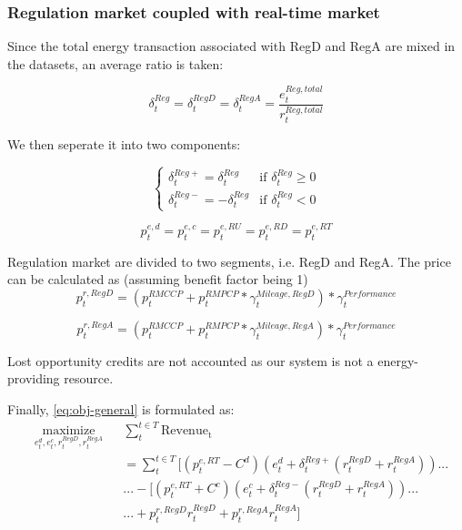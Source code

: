 \subsubsection{Regulation market coupled with real-time market}

Since the total energy transaction associated with RegD and RegA are mixed in the datasets, an average ratio is taken:

\begin{equation*}
\delta^{Reg}_t = \delta^{RegD}_t =\delta^{RegA}_t   = \frac{e_t^{Reg, total}}{r_t^{Reg, total}}
\end{equation*}

We then seperate it into two components:

\begin{equation*}
\begin{cases} 
\delta^{Reg+}_t = \delta^{Reg}_t &\mbox{if } \delta^{Reg}_t \geq 0 \\ 
\delta^{Reg-}_t = -\delta^{Reg}_t & \mbox{if } \delta^{Reg}_t < 0 
\end{cases} 
\end{equation*}

\begin{equation*}
p_t^{e, d} = p_t^{e, c} = p_t^{e, RU}  = p_t^{e, RD}  = p_t^{e,RT}
\end{equation*}

Regulation market are divided to two segments, i.e. RegD and RegA. The price can be calculated as (assuming benefit factor being 1)
\begin{equation*}
p_t^{r, RegD} = (p_t^{RMCCP} + p_t^{RMPCP} * \gamma_t^{Mileage, RegD}) * \gamma_t^{Performance}
\end{equation*}

\begin{equation*}
p_t^{r, RegA} = (p_t^{RMCCP} + p_t^{RMPCP} * \gamma_t^{Mileage, RegA}) * \gamma_t^{Performance}
\end{equation*}

Lost opportunity credits are not accounted as our system is not a energy-providing resource.

Finally, \ref{eq:obj-general} is formulated as:
\begin{equation}
\begin{aligned}
& \underset{e_t^d, e_t^c, r^{RegD}_t, r^{RegA}_t}{\text{maximize}}
& & \sum_t^{t \in T} \mathrm{Revenue_t} \\
& & &= \sum_t^{t \in T} [(p_t^{e,RT}-C^d) (e_t^d + \delta_t^{Reg+} (r_t^{RegD} + r_t^{RegA})) ...\\
& & & ... -[(p_t^{e,RT}+C^c) (e_t^c + \delta_t^{Reg-} (r_t^{RegD} + r_t^{RegA})) ... \\
& & & ...  + p_t^{r, RegD} r^{RegD}_t + p_t^{r, RegA} r^{RegA}_t]\\
\end{aligned}
\end{equation}


